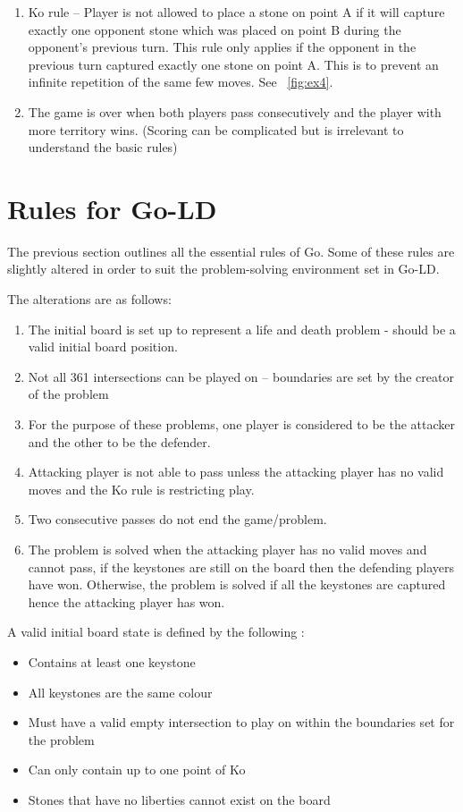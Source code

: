 \documentclass{l4proj}
\begin{document}
\begin{enumerate}
  \item Ko rule – Player is not allowed to place a stone on point A if it will capture exactly one opponent stone which was placed on point B during the opponent’s previous turn. This rule only applies if the opponent in the previous turn captured exactly one stone on point A. This is to prevent an infinite repetition of the same few moves. See ~\autoref{fig:ex4}.

  \item The game is over when both players pass consecutively and the player with more territory wins. (Scoring can be complicated but is irrelevant to understand the basic rules)

\end{enumerate}




\section{Rules for Go-LD}
The previous section outlines all the essential rules of Go. Some of these rules are slightly altered in order to suit the problem-solving environment set in Go-LD.

The alterations are as follows:
\begin{enumerate}

\item The initial board is set up to represent a life and death problem - should be a valid initial board position.
\item Not all 361 intersections can be played on – boundaries are set by the creator of the problem
\item For the purpose of these problems, one player is considered to be the attacker and the other to be the defender.
\item Attacking player is not able to pass unless the attacking player has no valid moves and the Ko rule is restricting play.
\item Two consecutive passes do not end the game/problem.
\item The problem is solved when the attacking player has no valid moves and cannot pass, if the keystones are still on the board then the defending players have won. Otherwise, the problem is solved if all the keystones are captured hence the attacking player has won.

\end{enumerate}


\bigskip
A valid initial board state is defined by the following :
\begin{itemize}
\item Contains at least one keystone
\item All keystones are the same colour
\item Must have a valid empty intersection to play on within the boundaries set for the problem
\item Can only contain up to one point of Ko
\item Stones that have no liberties cannot exist on the board
\end{itemize}
\end{document}
